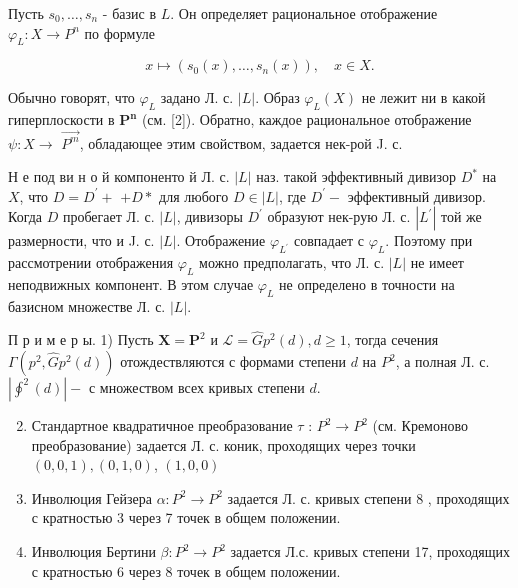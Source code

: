 \documentclass[10pt]{article}
\begin{document}
Пусть $s_{0}, \ldots, s_{n}$ - базис в $L$. Он определяет рациональное отображение $\varphi_{L}: X \rightarrow P^{n}$ по формуле



\[

x \mapsto\left(s_{0}(x), \ldots, s_{n}(x)\right), \quad x \in X .

\]



Обычно говорят, что $\varphi_{L}$ задано Л. с. $|L|$. Образ $\varphi_{L}(X)$ не лежит ни в какой гиперплоскости в $\boldsymbol{P}^{\boldsymbol{n}}$ (см. [2]). Обратно, каждое рациональное отображение $\psi: X \rightarrow$ $\overrightarrow{P^{m}}$, обладающее этим свойством, задается нек-рой J. с.



Н е под ви н о й компоненто й Л. с. $|L|$ наз. такой эффективный дивизор $D^{*}$ на $X$, что $D=D^{\prime}+$ $+D *$ для любого $D \in|L|$, где $D^{\prime}-$ эффективный дивизор. Когда $D$ пробегает Л. с. $|L|$, дивизоры $D^{\prime}$ образуют нек-рую Л. с. $\left|L^{\prime}\right|$ той же размерности, что и J. с. $|L|$. Отображение $\varphi_{L^{\prime}}$ совпадает с $\varphi_{L}$. Поэтому при рассмотрении отображения $\varphi_{L}$ можно предполагать, что Л. с. $|L|$ не имеет неподвижных компонент. В этом случае $\varphi_{L}$ не определено в точности на базисном множестве Л. с. $|L|$.



П р и м е р ы. 1) Пусть $\boldsymbol{X}=\boldsymbol{P}^{2}$ и $\mathscr{L}=\widehat{G} p^{2}(d), d \geqslant 1$, тогда сечения $\Gamma\left(p^{2}, \widehat{G} p^{2}(d)\right)$ отождествляются с формами степени $d$ на $P^{2}$, а полная Л. с. $\left|\oint^{2}(d)\right|-$ с множеством всех кривых степени $d$.



\begin{enumerate}

  \setcounter{enumi}{1}

  \item Стандартное квадратичное преобразование $\tau$ : $P^{2} \rightarrow P^{2}$ (см. Кремоново преобразование) задается Л. с. коник, проходящих через точки $(0,0,1),(0,1,0)$, $(1,0,0)$



  \item Инволюция Гейзера $\alpha: P^{2} \rightarrow P^{2}$ задается Л. с. кривых степени 8 , проходящих с кратностью 3 через 7 точек в общем положении.



  \item Инволюция Бертини $\beta: P^{2} \rightarrow P^{2}$ задается Л.с. кривых степени 17, проходящих с кратностью 6 через 8 точек в общем положении.



\end{enumerate}
\end{document}
